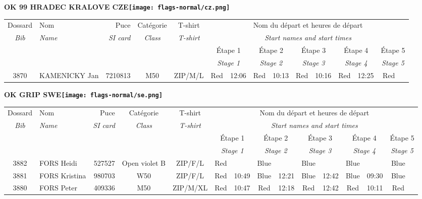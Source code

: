 \documentclass{report}
\begin{document}
\newpage
  \Huge \centering \bfseries OK 99 HRADEC KRALOVE  CZE\normalfont \footnotesize \sffamily \hfill \texttt{[image: flags-normal/cz.png]} \newline 
  \begin{longtable}{|c|l|r|c|c|*{5}{cc|}}
    Dossard & Nom  & Puce    & Catégorie & T-shirt & \multicolumn{10}{c|}{Nom du départ et heures de départ} \\
    \itshape Bib     & \itshape Name & \itshape SI card & \itshape Class  & \itshape  T-shirt  & \multicolumn{10}{c|}{\itshape Start names and start times} \\
    \hline
    & & & & & \multicolumn{2}{c|}{Étape 1} & \multicolumn{2}{c|}{Étape 2} & \multicolumn{2}{c|}{Étape 3} & \multicolumn{2}{c|}{Étape 4} & \multicolumn{2}{c|}{Étape 5} \\
    & & & & & \multicolumn{2}{c|}{\itshape Stage 1} & \multicolumn{2}{c|}{\itshape Stage 2} & \multicolumn{2}{c|}{\itshape Stage 3} & \multicolumn{2}{c|}{\itshape Stage 4} & \multicolumn{2}{c|}{\itshape Stage 5} \\
    \hline
    3870 & KAMENICKY Jan & 7210813 & M50 & ZIP/M/L & Red & 12:06 & Red & 10:13 & Red & 10:16 & Red & 12:25 & Red &  \\
  \end{longtable}
\newpage
  \Huge \centering \bfseries OK GRIP  SWE\normalfont \footnotesize \sffamily \hfill \texttt{[image: flags-normal/se.png]} \newline 
  \begin{longtable}{|c|l|r|c|c|*{5}{cc|}}
    Dossard & Nom  & Puce    & Catégorie & T-shirt & \multicolumn{10}{c|}{Nom du départ et heures de départ} \\
    \itshape Bib     & \itshape Name & \itshape SI card & \itshape Class  & \itshape  T-shirt  & \multicolumn{10}{c|}{\itshape Start names and start times} \\
    \hline
    & & & & & \multicolumn{2}{c|}{Étape 1} & \multicolumn{2}{c|}{Étape 2} & \multicolumn{2}{c|}{Étape 3} & \multicolumn{2}{c|}{Étape 4} & \multicolumn{2}{c|}{Étape 5} \\
    & & & & & \multicolumn{2}{c|}{\itshape Stage 1} & \multicolumn{2}{c|}{\itshape Stage 2} & \multicolumn{2}{c|}{\itshape Stage 3} & \multicolumn{2}{c|}{\itshape Stage 4} & \multicolumn{2}{c|}{\itshape Stage 5} \\
    \hline
    3882 & FORS Heidi & 527527 & Open violet B & ZIP/F/L & Red &   & Blue &   & Blue &   & Blue &   & Blue &  \\
    3881 & FORS Kristina & 980703 & W50 & ZIP/F/L & Red & 10:49 & Blue & 12:21 & Blue & 12:42 & Blue & 09:30 & Blue &  \\
    3880 & FORS Peter & 409336 & M50 & ZIP/M/XL & Red & 10:47 & Red & 12:18 & Red & 12:42 & Red & 10:11 & Red &  \\
  \end{longtable}
\end{document}
